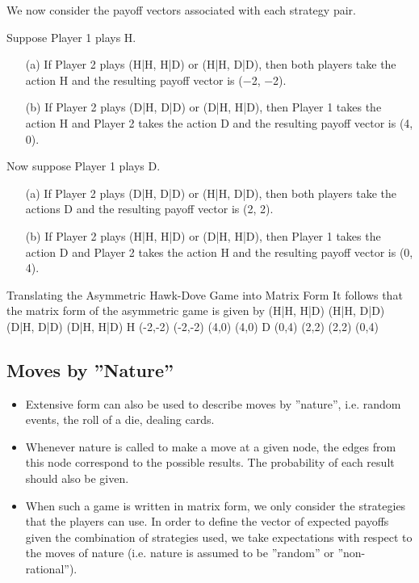 \documentclass[]{report}
\begin{document}
We now consider the payoff vectors associated with each strategy
pair.
\begin{framed}
\noindent Suppose Player 1 plays H.
\begin{itemize}
	\item [(a)] If Player 2 plays (H|H, H|D) or (H|H, D|D), then both players
take the action H and the resulting payoff vector is (−2, −2).
	\item [(b)] If Player 2 plays (D|H, D|D) or (D|H, H|D), then Player 1
takes the action H and Player 2 takes the action D and the
resulting payoff vector is (4, 0).
\end{itemize}
\end{framed}

Now suppose Player 1 plays D.
\begin{itemize}
	\item [(a)] If Player 2 plays (D|H, D|D) or (H|H, D|D), then both players
	take the actions D and the resulting payoff vector is (2, 2).
	\item [(b)] If Player 2 plays (H|H, H|D) or (D|H, H|D), then Player 1 takes
	the action D and Player 2 takes the action H and the resulting
	payoff vector is (0, 4).
\end{itemize}

Translating the Asymmetric Hawk-Dove Game into Matrix
Form
It follows that the matrix form of the asymmetric game is given by
(H|H, H|D) (H|H, D|D) (D|H, D|D) (D|H, H|D)
H (-2,-2) (-2,-2) (4,0) (4,0)
D (0,4) (2,2) (2,2) (0,4)

\subsection{Moves by ”Nature”}
\begin{itemize}
	\item Extensive form can also be used to describe moves by ”nature”,
	i.e. random events, the roll of a die, dealing cards.
\item Whenever nature is called to make a move at a given node, the
	edges from this node correspond to the possible results. The
	probability of each result should also be given.
\item When such a game is written in matrix form, we only consider the
	strategies that the players can use. In order to define the vector of
	expected payoffs given the combination of strategies used, we
	take expectations with respect to the moves of nature (i.e. nature
	is assumed to be ”random” or ”non-rational”).
\end{itemize}
\end{document}
